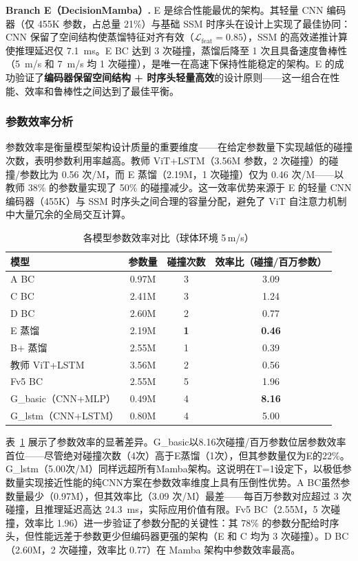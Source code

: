\documentclass[12pt,a4paper]{article}
\numberwithin{equation}{section}
\numberwithin{figure}{section}
\numberwithin{table}{section}
\begin{document}
\textbf{Branch E（DecisionMamba）.} E 是综合性能最优的架构。其轻量 CNN 编码器（仅 455K 参数，占总量 21\%）与基础 SSM 时序头在设计上实现了最佳协同：CNN 保留了空间结构使蒸馏特征对齐有效（$\mathcal{L}_{\text{feat}}=0.85$），SSM 的高效递推计算使推理延迟仅 7.1~ms。E BC 达到 3 次碰撞，蒸馏后降至 1 次且具备速度鲁棒性（5~m/s 和 7~m/s 均 1 次碰撞），是唯一在高速下保持性能稳定的架构。E 的成功验证了\textbf{编码器保留空间结构 + 时序头轻量高效}的设计原则——这一组合在性能、效率和鲁棒性之间达到了最佳平衡。

\subsubsection{参数效率分析}
\label{sec:param-efficiency}

参数效率是衡量模型架构设计质量的重要维度——在给定参数量下实现越低的碰撞次数，表明参数利用率越高。教师 ViT+LSTM（3.56M 参数，2 次碰撞）的碰撞/参数比为 0.56 次/M，而 E 蒸馏（2.19M，1 次碰撞）仅为 0.46 次/M——以教师 38\% 的参数量实现了 50\% 的碰撞减少。这一效率优势来源于 E 的轻量 CNN 编码器（455K）与 SSM 时序头之间合理的容量分配，避免了 ViT 自注意力机制中大量冗余的全局交互计算。

\begin{table}[H]
\centering
\caption{各模型参数效率对比（球体环境 5\,m/s）}
\label{tab:param-efficiency}
\begin{tabular}{lccc}
\toprule
模型 & 参数量 & 碰撞次数 & 效率比（碰撞/百万参数） \\
\midrule
A BC & 0.97M & 3 & 3.09 \\
C BC & 2.41M & 3 & 1.24 \\
D BC & 2.60M & 2 & 0.77 \\
E 蒸馏 & 2.19M & \textbf{1} & \textbf{0.46} \\
B+ 蒸馏 & 2.55M & 1 & 0.39 \\
教师 ViT+LSTM & 3.56M & 2 & 0.56 \\
Fv5 BC & 2.55M & 5 & 1.96 \\
G\_basic（CNN+MLP） & 0.49M & 4 & \textbf{8.16} \\
G\_lstm（CNN+LSTM） & 0.80M & 4 & 5.00 \\
\bottomrule
\end{tabular}
\end{table}

表~\ref{tab:param-efficiency} 展示了参数效率的显著差异。G\_basic以8.16次碰撞/百万参数位居参数效率首位——尽管绝对碰撞次数（4次）高于E蒸馏（1次），但其参数量仅为E的22\%。G\_lstm（5.00次/M）同样远超所有Mamba架构。这说明在T=1设定下，以极低参数量实现接近性能的纯CNN方案在参数效率维度上具有压倒性优势。A BC虽然参数量最少（0.97M），但其效率比（3.09 次/M）最差——每百万参数对应超过 3 次碰撞，且推理延迟高达 24.3~ms，实际应用价值有限。Fv5 BC（2.55M，5 次碰撞，效率比 1.96）进一步验证了参数分配的关键性：其 78\% 的参数分配给时序头，但性能远差于参数更少但编码器更强的架构（E 和 C 均为 3 次碰撞）。D BC（2.60M，2 次碰撞，效率比 0.77）在 Mamba 架构中参数效率最高。
\end{document}
